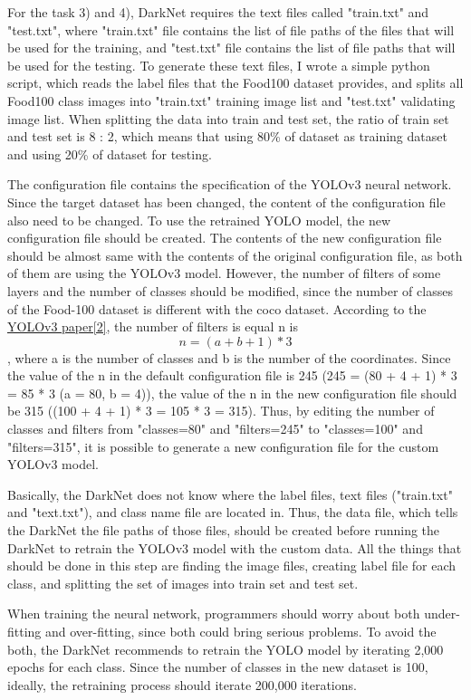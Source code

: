 \documentclass{article}
\begin{document}
For the task 3) and 4), DarkNet requires the text files called "train.txt" and "test.txt", where "train.txt" file contains the list of file paths of the files that will be used for the training, and "test.txt" file contains the list of file paths that will be used for the testing. To generate these text files, I wrote a simple python script, which reads the label files that the Food100 dataset provides, and splits all Food100 class images into "train.txt" training image list and "test.txt" validating image list. When splitting the data into train and test set, the ratio of train set and test set is 8 : 2, which means that using 80\% of dataset as training dataset and using 20\% of dataset for testing.

The configuration file contains the specification of the YOLOv3 neural network. Since the target dataset has been changed, the content of the configuration file also need to be changed. To use the retrained YOLO model, the new configuration file should be created. The contents of the new configuration file should be almost same with the contents of the original configuration file, as both of them are using the YOLOv3 model. However, the number of filters of some layers and the number of classes should be modified, since the number of classes of the Food-100 dataset is different with the coco dataset. According to the \hyperlink{ref2}{YOLOv3 paper[2]}, the number of filters is equal n is $$n = (a + b + 1) * 3$$, where a is the number of classes and b is the number of the coordinates. Since the value of the n in the default configuration file is 245 (245 = (80 + 4 + 1) * 3 = 85 * 3  (a = 80, b = 4)), the value of the n in the new configuration file should be 315 ((100 + 4 + 1) * 3 = 105 * 3 = 315). Thus, by editing the number of classes and filters from "classes=80" and "filters=245" to "classes=100" and "filters=315", it is possible to generate a new configuration file for the custom YOLOv3 model.

Basically, the DarkNet does not know where the label files, text files ("train.txt" and "text.txt"), and class name file are located in. Thus, the data file, which tells the DarkNet the file paths of those files, should be created before running the DarkNet to retrain the YOLOv3 model with the custom data. All the things that should be done in this step are finding the image files, creating label file for each class, and splitting the set of images into train set and test set.

When training the neural network, programmers should worry about both under-fitting and over-fitting, since both could bring serious problems. To avoid the both, the DarkNet recommends to retrain the YOLO model by iterating 2,000 epochs for each class. Since the number of classes in the new dataset is 100, ideally, the retraining process should iterate 200,000 iterations.
\end{document}
